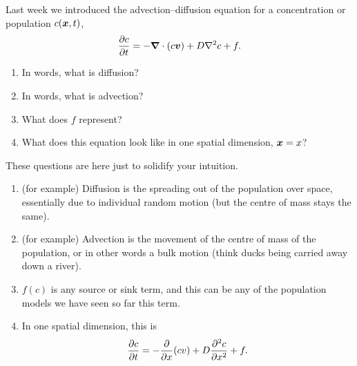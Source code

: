 \documentclass[a4paper,12pt]{article}
\begin{document}
\begin{enumerate}[label={\bf \arabic{*}.\;}, ref={\arabic{*}},itemsep=3ex, left=0ex]
    {
      Last week we introduced the advection--diffusion equation for a concentration or population $c(\v{x},t)$,
      \begin{equation}
        \pd{c}{t} = -\vnabla\cdot(c\v{v})+D\Lap c + f.
      \end{equation}
      \begin{enumerate}[label=(\alph*)]
        \item In words, what is diffusion?
        \item In words, what is advection?
        \item What does $f$ represent?
        \item What does this equation look like in one spatial dimension, $\v{x}=x$?
      \end{enumerate}
    }
    { %
      These questions are here just to solidify your intuition.
      \begin{enumerate}[label=(\alph*)]
        \item (for example) Diffusion is the spreading out of the population over space, essentially due to individual random motion (but the centre of mass stays the same).
        \item (for example) Advection is the movement of the centre of mass of the population, or in other words a bulk motion (think ducks being carried away down a river).
        \item $f(c)$ is any source or sink term, and this can be any of the population models we have seen so far this term.
        \item In one spatial dimension, this is
          \begin{equation}
            \pd{c}{t} = -\pd{}{x}(cv)+D\pdd{c}{x} + f.
          \end{equation}
      \end{enumerate}

    }


\end{enumerate}
\end{document}
